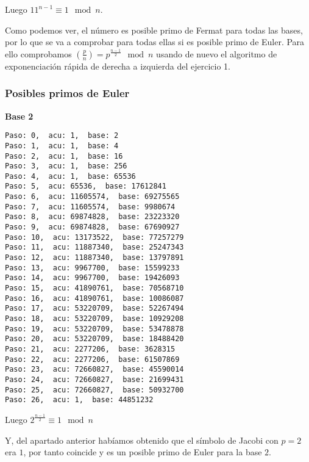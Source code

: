 \documentclass[a4paper]{article}
\begin{document}
Luego $11^{n-1}\equiv 1 \mod n$.


Como podemos ver, el número es posible primo de Fermat para todas las bases, por lo que se va a comprobar para todas ellas si es posible primo de Euler. Para ello comprobamos $\left( \frac{p}{n} \right)= p^{\frac{n-1}{2}}\mod n$ usando de nuevo el algoritmo de exponenciación rápida de derecha a izquierda del ejercicio 1.

\subsubsection{Posibles primos de Euler}

\textbf{Base 2}
\begin{verbatim}
Paso: 0,  acu: 1,  base: 2  
Paso: 1,  acu: 1,  base: 4  
Paso: 2,  acu: 1,  base: 16  
Paso: 3,  acu: 1,  base: 256  
Paso: 4,  acu: 1,  base: 65536  
Paso: 5,  acu: 65536,  base: 17612841  
Paso: 6,  acu: 11605574,  base: 69275565  
Paso: 7,  acu: 11605574,  base: 9980674  
Paso: 8,  acu: 69874828,  base: 23223320  
Paso: 9,  acu: 69874828,  base: 67690927  
Paso: 10,  acu: 13173522,  base: 77257279  
Paso: 11,  acu: 11887340,  base: 25247343  
Paso: 12,  acu: 11887340,  base: 13797891  
Paso: 13,  acu: 9967700,  base: 15599233  
Paso: 14,  acu: 9967700,  base: 19426093  
Paso: 15,  acu: 41890761,  base: 70568710  
Paso: 16,  acu: 41890761,  base: 10086087  
Paso: 17,  acu: 53220709,  base: 52267494  
Paso: 18,  acu: 53220709,  base: 10929208  
Paso: 19,  acu: 53220709,  base: 53478878  
Paso: 20,  acu: 53220709,  base: 18488420  
Paso: 21,  acu: 2277206,  base: 3628315  
Paso: 22,  acu: 2277206,  base: 61507869  
Paso: 23,  acu: 72660827,  base: 45590014  
Paso: 24,  acu: 72660827,  base: 21699431  
Paso: 25,  acu: 72660827,  base: 50932700  
Paso: 26,  acu: 1,  base: 44851232  
\end{verbatim}

Luego $2^{\frac{n-1}{2}}\equiv 1\mod n$

Y, del apartado anterior habíamos obtenido que el símbolo de Jacobi con $p=2$ era $1$, por tanto coincide y es un posible primo de Euler para la base $2$.
\end{document}
